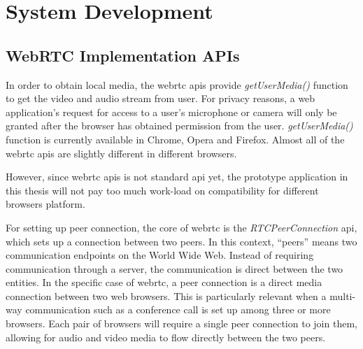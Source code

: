 \chapter{System Development}
\label{chp:sys_dev}

\section{WebRTC Implementation APIs}

\par In order to obtain local media, the \gls{webrtc} \gls{api}s provide \textit{getUserMedia()} function to get the video and audio stream from user. For privacy reasons, a web application’s request for access to a user’s microphone or camera will only be granted after the browser has obtained permission from the user. \textit{getUserMedia()} function is currently available in Chrome, Opera and Firefox. Almost all of the \gls{webrtc} \gls{api}s are slightly different in different browsers.


However, since \gls{webrtc} \gls{api}s is not standard \gls{api} yet, the prototype application in this thesis will not pay too much work-load on compatibility for different browsers platform.

\par For setting up peer connection, the core of \gls{webrtc} is the \textit{RTCPeerConnection} \gls{api}, which sets up a connection between two peers. In this context, “peers” means two communication endpoints on the World Wide Web. Instead of requiring communication through a server, the communication is direct between the two entities. In the specific case of \gls{webrtc}, a peer connection is a direct media connection between two web browsers. This is particularly relevant when a multi-way communication such as a conference call is set up among three or more browsers. Each pair of browsers will require a single peer connection to join them, allowing for audio and video media to flow directly between the two peers. 



